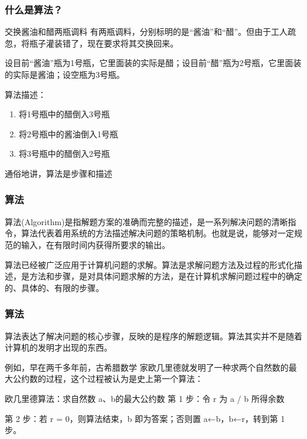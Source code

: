 \begin{frame}
    \frametitle{什么是算法？}
    \begin{block}{交换酱油和醋两瓶调料}
        有两瓶调料，分别标明的是“酱油”和“醋”。但由于工人疏忽，将瓶子灌装错了，现在要求将其交换回来。
    \end{block}
    设目前“酱油”瓶为1号瓶，它里面装的实际是醋；设目前“醋”瓶为2号瓶，它里面装的实际是酱油；设空瓶为3号瓶。

    \begin{minipage}{0.48\linewidth}
        算法描述：
        \begin{enumerate}
            \item 将1号瓶中的醋倒入3号瓶
            \item 将2号瓶中的酱油倒入1号瓶
            \item 将3号瓶中的醋倒入2号瓶
          \end{enumerate}
    \end{minipage}\hfill
    \begin{minipage}{0.48\linewidth}
        \begin{blankblock}{}
            通俗地讲，算法是步骤和描述
        \end{blankblock}
    \end{minipage}
    
\end{frame}

\begin{frame}
    \frametitle{算法}
    算法(Algorithm)是指解题方案的准确而完整的描述，是一系列解决问题的清晰指令，算法代表着用系统的方法描述解决问题的策略机制。也就是说，能够对一定规范的输入，在有限时间内获得所要求的输出。
    \bigskip

    算法已经被广泛应用于计算机问题的求解。算法是求解问题方法及过程的形式化描述，是方法和步骤，是对具体问题求解的方法，是在计算机求解问题过程中的确定的、具体的、有限的步骤。
\end{frame}


\begin{frame}
    \frametitle{算法}
    算法表达了解决问题的核心步骤，反映的是程序的解题逻辑。算法其实并不是随着计算机的发明才出现的东西。

    例如，早在两千多年前，古希腊数学 家欧几里德就发明了一种求两个自然数的最大公约数的过程，这个过程被认为是史上第一个算法：
    \begin{block}{欧几里德算法：求自然数 a、b的最大公约数 }
    第 1 步：令 r 为 a / b 所得余数
    
    第 2 步：若 r = 0，则算法结束，b 即为答案；否则置 a←b，b←r，转到第 1 步。
    \end{block}
\end{frame}


